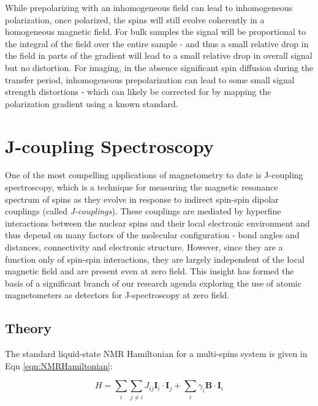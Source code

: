 \documentclass[PaulGanssle-Thesis.tex]{subfiles}
\begin{document}
While prepolarizing with an inhomogeneous field can lead to inhomogeneous polarization, once polarized, the spins will still evolve coherently in a homogeneous magnetic field. For bulk samples the signal will be proportional to the integral of the field over the entire sample - and thus a small relative drop in the field in parts of the gradient will lead to a small relative drop in overall signal but no distortion. For imaging, in the absence significant spin diffusion during the transfer period, inhomogeneous prepolarization can lead to some small signal strength distortions - which can likely be corrected for by mapping the polarization gradient using a known standard.

\section{J-coupling Spectroscopy}
\label{nmr.signal.jcoupling}
One of the most compelling applications of magnetometry to date is J-coupling spectroscopy, which is a technique for measuring the magnetic resonance spectrum of spins as they evolve in response to indirect spin-spin dipolar couplings (called \textit{J-couplings}).\cite{Zax1984,McDermott2002,appelt-natphys-2006} These couplings are mediated by hyperfine interactions between the nuclear spins and their local electronic environment and thus depend on many factors of the molecular configuration - bond angles and distances, connectivity and electronic structure. However, since they are a function only of spin-spin interactions, they are largely independent of the local magnetic field and are present even at zero field. This insight has formed the basis of a significant branch of our research agenda exploring the use of atomic magnetometers as detectors for J-spectroscopy at zero field.\cite{Ledbetter2009,Theis2012,Butler2013,Theis2013}

\subsection{Theory}
\label{nmr.jcoupling.theory}
The standard liquid-state NMR Hamiltonian for a multi-spins system is given in Eqn \ref{eqn:NMRHamiltonian}:\cite{Butler2013a}

\begin{equation}
\label{eqn:NMRHamiltonian}
H = \sum_{i}\sum_{j\neq{i}}J_{ij}\mathbf{I}_{i}\cdot\mathbf{I}_{j} + \sum_{i}\gamma_{i}\mathbf{B}\cdot\mathbf{I}_{i}
\end{equation}
\end{document}
